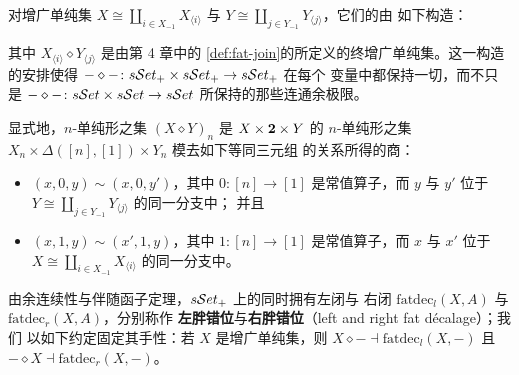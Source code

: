 \begin{definition}\label{def:fat-join-augmented}
对增广单纯集 $X\cong\coprod_{i\in X_{-1}}X_{\langle i\rangle}$ 与%
$Y\cong\coprod_{j\in Y_{-1}}Y_{\langle j\rangle}$，它们的\textbf{\trFatJoin}由%
如下\trPushout{}构造：
\begin{center}
\end{center}
其中 $X_{\langle i\rangle}\diamond Y_{\langle j\rangle}$ 是由第 4 章中的%
\cref{def:fat-join}的\trFatJoin{}所定义的终增广单纯集。这一构造的安排使得%
\trBifunctor{} $-\diamond-\colon s\mathcal{S}et_{+}\times s\mathcal{S}et_{+}\to s\mathcal{S}et_{+}$ 在每个
变量中都保持一切\trColimit，而不只是\trBifunctor{} $-\diamond-\colon s\mathcal{S}et\times s\mathcal{S}et\to s\mathcal{S}et$
所保持的那些连通余极限。
\end{definition}

显式地，$n$-单纯形之集 $(X\diamond Y)_{n}$ 是 $X\times\mathbf{2}\times Y$ 的%
$n$-单纯形之集 $X_{n}\times\Delta([n],[1])\times Y_{n}$ 模去如下等同三元组%
的关系所得的商：
\begin{itemize}
\item $(x,0,y)\sim(x,0,y')$，其中 $0\colon[n]\to[1]$ 是常值算子，而 $y$ 与%
$y'$ 位于 $Y\cong\coprod_{j\in Y_{-1}}Y_{\langle j\rangle}$ 的同一分支中；%
并且
\item $(x,1,y)\sim(x',1,y)$，其中 $1\colon[n]\to[1]$ 是常值算子，而 $x$ 与%
$x'$ 位于 $X\cong\coprod_{i\in X_{-1}}X_{\langle i\rangle}$ 的同一分支中。
\end{itemize}

由余连续性与伴随函子定理，$s\mathcal{S}et_{+}$ 上的\trFatJoin\trBifunctor{}同时拥有左闭与%
右闭 $\mathrm{fatdec}_{l}(X,A)$ 与 $\mathrm{fatdec}_{r}(X,A)$，分别称作%
\textbf{左胖错位}与\textbf{右胖错位}（left and right fat décalage）；我们%
以如下约定固定其手性：若 $X$ 是增广单纯集，则
$X\diamond-\dashv\mathrm{fatdec}_{l}(X,-)$ 且
$-\diamond X\dashv\mathrm{fatdec}_{r}(X,-)$。

